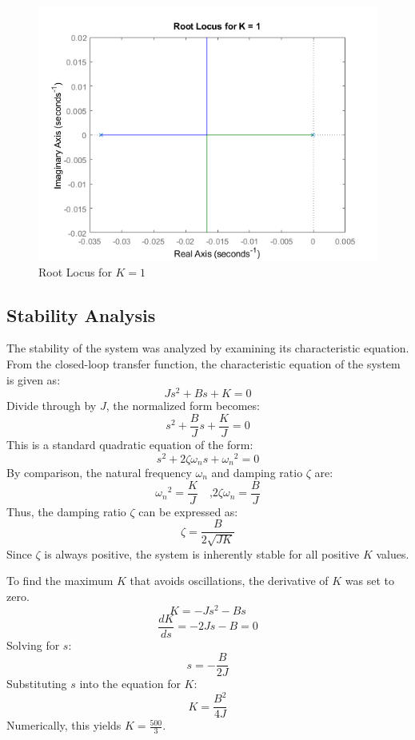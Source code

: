 \documentclass[a4paper, 12pt, english]{article}
\begin{document}
\begin{figure}[H]
    \centering
    \includegraphics[width=0.7\linewidth]{report/images/RootLocusK1.png}
    \caption{Root Locus for $K=1$}
    \label{fig:Root Locus for K = 1}
\end{figure}

\subsection{Stability Analysis} \label{sec:stability analysis}
The stability of the system was analyzed by examining its characteristic equation.
From the closed-loop transfer function, the characteristic equation of the system is given as:
\[ J{s}^{2} + B{s} + K = 0 \]
Divide through by $J$, the normalized form becomes:
\[ {s}^{2} + \frac{B}{J}{s} + \frac{K}{J} = 0 \]
This is a standard quadratic equation of the form:
\[ {s}^{2} + 2{\zeta}{{\omega}_{n}}{s} + {{\omega}_{n}}^{2} = 0 \]
By comparison, the natural frequency ${\omega}_{n}$ and damping ratio $\zeta$ are:
\[ {{\omega}_{n}}^{2} = \frac{K}{J} \quad\mbox{,} {2}{\zeta}{{\omega}_{n}} = \frac{B}{J} \]
Thus, the damping ratio $\zeta$ can be expressed as:
\[ \zeta = \frac{B}{2\sqrt{{J}{K}}} \]
Since $\zeta$  is always positive, the system is inherently stable for all positive $K$ values.



\noindent
To find the maximum $K$ that avoids oscillations, the derivative of $K$ was set to zero.
\[ K = -{J}{{s}^{2}} - {B}{s} \]
\[ \frac{dK}{ds} = -{2}{J}{s} - {B} = 0 \]
Solving for $s$: 
\[s = -{\frac{B}{2J}} \]
Substituting $s$ into the equation for $K$:
\[ K = \frac{{B}^{2}}{{4}{J}} \]
Numerically, this yields $K = \frac{500}{3}$.
\end{document}
